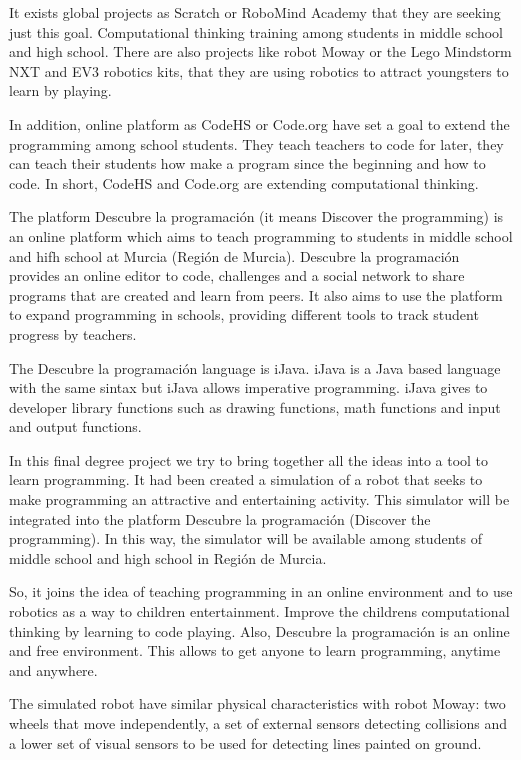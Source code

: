 It exists global projects as Scratch or RoboMind Academy that they are seeking just this goal. Computational thinking training among students in middle school and high school. There are also projects like robot Moway or the Lego Mindstorm NXT and EV3 robotics kits, that they are using robotics to attract youngsters to learn by playing. 

In addition, online platform as CodeHS or Code.org have set a goal to extend the programming among school students. They teach teachers to code for later, they can teach their students how make a program since the beginning and how to code. In short, CodeHS and Code.org are extending computational thinking.

The platform Descubre la programación (it means Discover the programming) is an online platform which aims to teach programming to students in middle school and hifh school at Murcia (Región de Murcia). Descubre la programación provides an online editor to code, challenges and a social network to share programs that are created and learn from peers. It also aims to use the platform to expand programming in schools, providing different tools to track student progress by teachers.

The Descubre la programación language is iJava. iJava is a Java based language with the same sintax but iJava allows imperative programming. iJava gives to developer library functions such as drawing functions, math functions and input and output functions.

In this final degree project we try to bring together all the ideas into a tool to learn programming. It had been created a simulation of a robot that seeks to make programming an attractive and entertaining activity. This simulator will be integrated into the platform Descubre la programación (Discover the programming). In this way, the simulator will be available among students of middle school and high school in Región de Murcia.

So, it joins the idea of teaching programming in an online environment and to use robotics as a way to children entertainment. Improve the childrens computational thinking by learning to code playing. Also, Descubre la programación is an online and free environment. This allows to get anyone to learn programming, anytime and anywhere. 


The simulated robot have similar physical characteristics with robot Moway: two wheels that move independently, a set of external sensors detecting collisions and a lower set of visual sensors to be used for detecting lines painted on ground.




